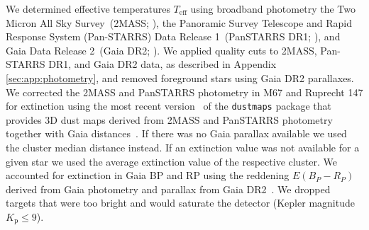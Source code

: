 \documentclass{aa}
\begin{document}
We determined effective temperatures $T_\mathrm{eff}$ using broadband photometry the Two Micron All Sky Survey~(2MASS; \citealt{skrutskie_two_2006}), the Panoramic Survey Telescope and Rapid Response System \mbox{(Pan-STARRS)} Data Release 1~(PanSTARRS DR1; \citealt{2016arXiv161205560C}), and Gaia Data Release 2~(Gaia DR2; \citealt{gaia_dr2_release_2018}). We applied quality cuts to 2MASS, Pan-STARRS DR1, and Gaia DR2 data, as described in Appendix \ref{sec:app:photometry}, and removed foreground stars using Gaia DR2 parallaxes. We corrected the 2MASS and PanSTARRS photometry in M67 and Ruprecht 147 for extinction using the most recent version~\citep{green_bayestar_2019} of the \texttt{dustmaps} package that provides 3D dust maps derived from 2MASS and PanSTARRS photometry together with Gaia distances~\citep{green_dustmaps_2018}. If there was no Gaia parallax available we used the cluster median distance instead. If an extinction value was not available for a given star we used the average extinction value of the respective cluster. We accounted for extinction in Gaia BP and RP using the reddening $E(B_P-R_P)$ derived from Gaia photometry and parallax from Gaia DR2~\citep{andrae_gaiaapsis_2018}. We dropped targets that were too bright and would saturate the detector (Kepler magnitude $K_\mathrm{p} \leq 9$).
\\
\end{document}
